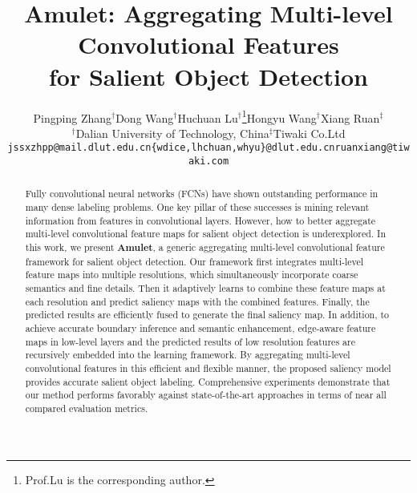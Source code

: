 \documentclass[10pt,twocolumn,letterpaper]{article}
\begin{document}
\title{Amulet: Aggregating Multi-level Convolutional Features \\ for Salient Object Detection}

\author{Pingping Zhang$^{\dagger}$\quad Dong Wang$^{\dagger}$\quad Huchuan Lu$^{\dagger}$\thanks{Prof.Lu is the corresponding author.}\quad Hongyu Wang$^{\dagger}$\quad Xiang Ruan$^{\ddagger}$\\
$^{\dagger}$Dalian University of Technology, China\quad\quad $^{\ddagger}$Tiwaki Co.Ltd\\
{\tt\small jssxzhpp@mail.dlut.edu.cn\quad \{wdice,lhchuan,whyu\}@dlut.edu.cn\quad ruanxiang@tiwaki.com}
}

\maketitle
\thispagestyle{empty}

\begin{abstract}
Fully convolutional neural networks (FCNs) have shown outstanding performance in many dense
labeling problems.
One key pillar of these successes is mining relevant information from features in convolutional layers.
However, how to better aggregate multi-level convolutional feature maps for salient object detection is underexplored.
In this work, we present \textbf{Amulet}, a generic aggregating multi-level convolutional feature framework for salient object detection.
Our framework first integrates multi-level feature maps into multiple resolutions, which simultaneously incorporate coarse semantics and fine details.
Then it adaptively learns to combine these feature maps at each resolution and predict saliency maps with the combined features. Finally, the predicted results are efficiently fused to generate the final saliency map.
In addition, to achieve accurate boundary inference and semantic enhancement, edge-aware feature maps in low-level layers and the predicted results of low resolution features are recursively embedded into the learning framework.
By aggregating multi-level convolutional features in this efficient and flexible manner, the proposed saliency model provides accurate salient object labeling.
Comprehensive experiments demonstrate that our method performs favorably against state-of-the-art approaches in terms of near all compared evaluation metrics.
\end{abstract}
\end{document}
